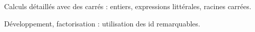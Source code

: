 \documentclass{évaluation}
\title{}
\begin{document}
\maketitle

\begin{exercice}
	Calculs détaillés avec des carrés : entiers, expressions littérales, racines carrées.
\end{exercice}

\begin{exercice}
	Développement, factorisation : utilisation des id remarquables.
\end{exercice}
\end{document}

